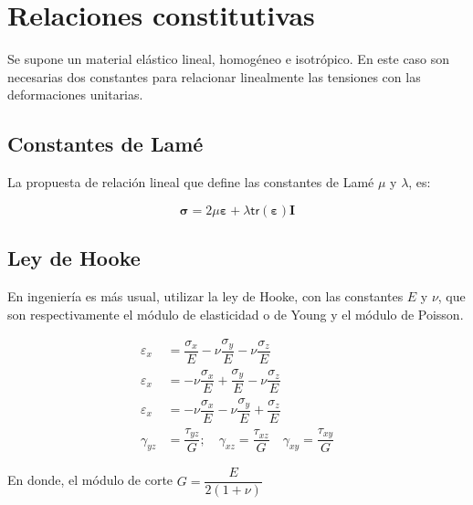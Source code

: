 \section{Relaciones constitutivas}

Se supone un material elástico lineal, homogéneo e isotrópico. En este caso son necesarias dos constantes para relacionar linealmente las tensiones con las deformaciones unitarias.

\subsection{Constantes de Lamé}
La propuesta de relación lineal que define las constantes de Lamé $\mu$ y $\lambda$, es:

\begin{equation}
	\bm{\sigma} = 2 \mu \bm{\varepsilon} + \lambda \mathsf{tr} \left( \bm{\varepsilon} \right) \mathbf{I}
\end{equation}

\subsection{Ley de Hooke}
En ingeniería es más usual, utilizar la ley de Hooke, con las constantes $E$ y $\nu$, que son respectivamente el módulo de elasticidad o de Young y el módulo de Poisson.

\begin{equation}
	\begin{split}
		\varepsilon_x &= \dfrac{\sigma_x}{E} - \nu \dfrac{\sigma_y}{E} - \nu \dfrac{\sigma_z}{E}\\[5mm]
		\varepsilon_x &= -\nu \dfrac{\sigma_x}{E} + \dfrac{\sigma_y}{E} - \nu \dfrac{\sigma_z}{E}\\[5mm]
		\varepsilon_x &= -\nu \dfrac{\sigma_x}{E} - \nu \dfrac{\sigma_y}{E} + \dfrac{\sigma_z}{E}\\[5mm]
		\gamma_{yz} &= \dfrac{\tau_{yz}}{G}; \quad \gamma_{xz} = \dfrac{\tau_{xz}}{G} \quad
		\gamma_{xy} = \dfrac{\tau_{xy}}{G}
	\end{split}
\end{equation}

En donde, el módulo de corte $G = \dfrac{E}{2 (1 + \nu)}$

